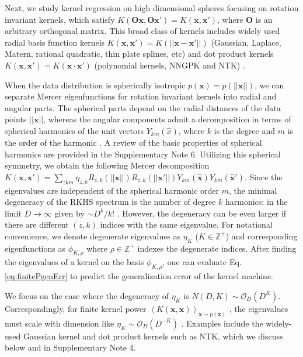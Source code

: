 \documentclass[11pt]{article}
\def\x{{\mathbf x}}
\begin{document}
Next, we study kernel regression on high dimensional spheres focusing on rotation invariant kernels, which satisfy $K(\mathbf{O} \mathbf{x},\mathbf{O} \mathbf{x}') = K(\mathbf{x},\mathbf{x}')$, 
where $\mathbf{O}$ is an arbitrary orthogonal matrix. This broad class of kernels includes widely used radial basis function kernels $K(\mathbf{x},\mathbf{x}') = K(||\mathbf{x}-\mathbf{x}'||)$ (Gaussian, Laplace, Matern, rational quadratic, thin plate splines, etc) and dot product kernels $K(\mathbf{x},\mathbf{x}') = K(\mathbf{x} \cdot \mathbf{x}')$ (polynomial kernels, NNGPK and NTK) \cite{ cho2009kernel,genton2001classes,RasmussenWilliams}. 

When the data distribution is spherically isotropic $p(\mathbf{x}) = p(||\mathbf{x}||)$, we can separate Mercer eigenfunctions for rotation invariant kernels into radial and angular parts. The spherical parts depend on the radial distances of the data points $||\x||$, whereas the angular components admit a decomposition in terms of spherical harmonics of the unit vectors $Y_{km}(\hat x)$, where $k$ is the degree and $m$ is the order of the harmonic \cite{dai2013spherical}. A review of the basic properties of spherical harmonics are provided in the Supplementary Note 6. Utilizing this spherical symmetry, we obtain the following Mercer decomposition $K(\mathbf{x},\mathbf{x}') = \sum_{z k m} \eta_{z,k} R_{z,k}(||\mathbf{x}||) R_{z,k}(||\mathbf{x}'||) Y_{km}(\mathbf{\hat{x}}) Y_{km}(\mathbf{\hat{x}'})$.	
Since the eigenvalues are independent of the spherical harmonic order $m$, the minimal degeneracy of the RKHS spectrum is the number of degree $k$ harmonics: in the limit $D \to \infty$ given by $\sim {D^k}/{k!}$ \cite{bietti2019inductive,yang2020finegrained}. However, the degeneracy can be even larger if there are different $(z,k)$ indices with the same eigenvalue. 
For notational convenience, we denote degenerate eigenvalues as $\eta_{K}$ ($K\in \mathbb{Z}^+$) and corresponding eigenfunctions as $\phi_{K,\rho}$ where $\rho \in \mathbb{Z}^+$ indexes the degenerate indices. After finding the eigenvalues of a kernel on the basis $\phi_{K,\rho}$, one can evaluate  Eq. \eqref{eq:finitePgenErr} to predict the generalization error of the kernel machine.

We focus on the case where the degeneracy of $\eta_{K}$ is $N(D,K) \sim \mathcal{O}_D(D^K)$.  Correspondingly, for finite kernel power $\left< K(\mathbf{x},\mathbf{x}) \right>_{\mathbf{x} \sim p(\mathbf{x})}$ , the eigenvalues must scale with dimension like $\eta_{K} \sim \mathcal{O}_D(D^{-K})$ \cite{cohen2019learning,bordelon2020spectrum}. Examples include the widely-used Gaussian kernel and dot product kernels such as NTK, which we discuss below and in Supplementary Note 4.  
\end{document}
